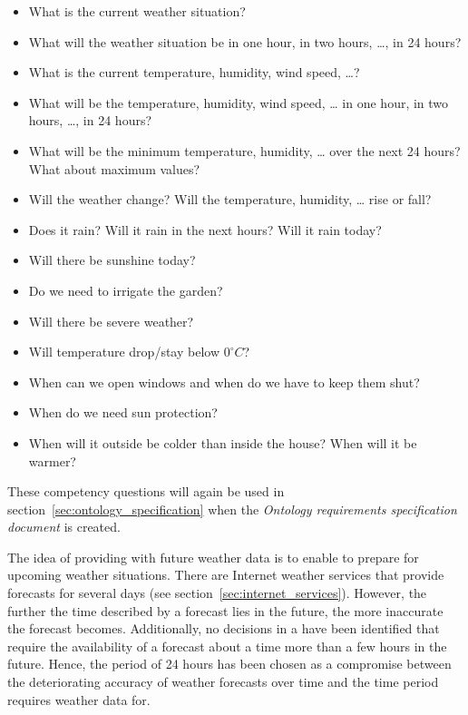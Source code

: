 \begin{itemize}
  \item What is the current weather situation?
  \item What will the weather situation be in one hour, in two hours, …, in 24 hours?
  \item What is the current temperature, humidity, wind speed, …?
  \item What will be the temperature, humidity, wind speed, … in one hour, in two hours, …, in 24 hours?
  \item What will be the minimum temperature, humidity, … over the next 24 hours? What about maximum values?
  \item Will the weather change? Will the temperature, humidity, … rise or fall?
  \item Does it rain? Will it rain in the next hours? Will it rain today?
  \item Will there be sunshine today? 
  \item Do we need to irrigate the garden?
  \item Will there be severe weather?
  \item Will temperature drop/stay below $0^\circ C$?
  \item When can we open windows and when do we have to keep them shut?
  \item When do we need sun protection?
  \item When will it outside be colder than inside the house? When will it be warmer?
\end{itemize}

These competency questions will again be used in section~\ref{sec:ontology_specification} when the \emph{Ontology requirements specification document} is created.

The idea of providing \thinkhome with future weather data is to enable \thinkhome to prepare for upcoming weather situations. There are Internet weather services that provide forecasts for several days (see section~\ref{sec:internet_services}). However, the further the time described by a forecast lies in the future, the more inaccurate the forecast becomes\cite{forecast_error1,forecast_error2}. Additionally, no decisions in a \smarthome have been identified that require the availability of a forecast about a time more than a few hours in the future. Hence, the period of 24 hours has been chosen as a compromise between the deteriorating accuracy of weather forecasts over time and the time period \thinkhome requires weather data for.

